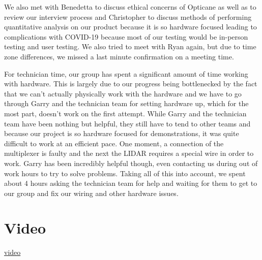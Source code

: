 \documentclass{article}
\begin{document}
We also met with Benedetta to discuss ethical concerns of Opticane as well as to review our interview process and Christopher to discuss methods of performing quantitative analysis on our product because it is so hardware focused leading to complications with COVID-19 because most of our testing would be in-person testing and user testing. We also tried to meet with Ryan again, but due to time zone differences, we missed a last minute confirmation on a meeting time.

For technician time, our group has spent a significant amount of time working with hardware. This is largely due to our progress being bottlenecked by the fact that we can't actually physically work with the hardware and we have to go through Garry and the technician team for setting hardware up, which for the most part, doesn't work on the first attempt. While Garry and the technician team have been nothing but helpful, they still have to tend to other teams and because our project is so hardware focused for demonstrations, it was quite difficult to work at an efficient pace. One moment, a connection of the multiplexer is faulty and the next the LIDAR requires a special wire in order to work. Garry has been incredibly helpful though, even contacting us during out of work hours to try to solve problems. Taking all of this into account, we spent about 4 hours asking the technician team for help and waiting for them to get to our group and fix our wiring and other hardware issues.

\section{Video}

\href{https://uoe-my.sharepoint.com/:v:/g/personal/s1870157_ed_ac_uk/EZqwO36IaARNh3at2NdNj7MBCREfd1ZNFWt3w-I8Hk6_nA?e=5qVUbM}{video}
\end{document}
